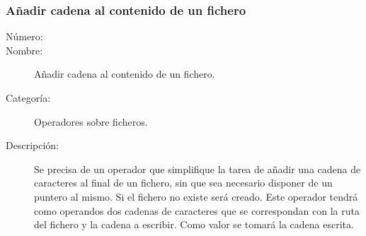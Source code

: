 \subsubsection{Añadir cadena al contenido de un fichero}
	\begin{description}
		\item [Número:] \cn
		\item [Nombre:] Añadir cadena al contenido de un fichero.
		\item [Categoría:] Operadores sobre ficheros.
		\item [Descripción:] Se precisa de un operador que simplifique la tarea de añadir una cadena de caracteres al final de un fichero, sin que sea necesario 
		disponer de un puntero al mismo. Si el fichero no existe será creado. Este operador tendrá como operandos dos cadenas 
		de caracteres que se correspondan con la ruta del fichero y la cadena a escribir. Como valor se tomará la cadena escrita.
	\end{description}
